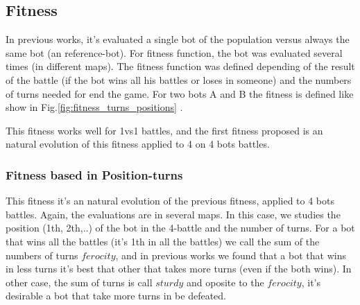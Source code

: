 \documentclass{llncs}
\begin{document}
\subsection{Fitness}

In previous works, it's evaluated a single bot of the population versus always the same bot (an reference-bot). For fitness function, the bot was evaluated several times (in different maps). The fitness function was defined depending of the result of the battle (if the bot wins all his battles or loses in someone) and the numbers of turns needed for end the game. For two bots A and B the fitness is defined like show in Fig.\ref{fig:fitness_turns_positions} . 

This fitness works well for 1vs1 battles, and the first fitness proposed is an natural evolution of this fitness applied to 4 on 4 bots battles.

\subsubsection{Fitness based in Position-turns}

This fitness it's an natural evolution of the previous fitness, applied to 4 bots battles. Again, the evaluations are in several maps. In this case, we studies the position (1th, 2th,..) of the bot in the 4-battle and the number of turns. For a bot that wins all the battles (it's 1th in all the battles) we call the sum of the numbers of turns {$ferocity$}, and in previous works we found that a bot that wins in less turns it's best that other that takes more turns (even if the both wins). In other case, the sum of turns is call {$sturdy$} and oposite to the {$ferocity$}, it's desirable a bot that take more turns in be defeated.
\end{document}
